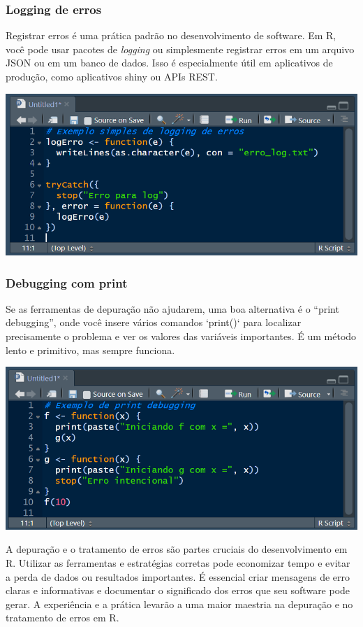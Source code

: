 \documentclass[
]{book}
\begin{document}
\subsubsection{Logging de erros}\label{logging-de-erros}

Registrar erros é uma prática padrão no desenvolvimento de software. Em R, você pode usar pacotes de \emph{logging} ou simplesmente registrar erros em um arquivo JSON ou em um banco de dados. Isso é especialmente útil em aplicativos de produção, como aplicativos shiny ou APIs REST.

\includegraphics{images/clipboard-2118828263.png}

\subsubsection{Debugging com print}\label{debugging-com-print}

Se as ferramentas de depuração não ajudarem, uma boa alternativa é o ``print debugging'', onde você insere vários comandos `print()` para localizar precisamente o problema e ver os valores das variáveis importantes. É um método lento e primitivo, mas sempre funciona.

\includegraphics{images/clipboard-2905347804.png}

A depuração e o tratamento de erros são partes cruciais do desenvolvimento em R. Utilizar as ferramentas e estratégias corretas pode economizar tempo e evitar a perda de dados ou resultados importantes. É essencial criar mensagens de erro claras e informativas e documentar o significado dos erros que seu software pode gerar. A experiência e a prática levarão a uma maior maestria na depuração e no tratamento de erros em R.
\end{document}
